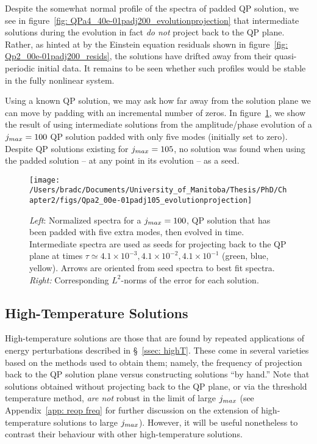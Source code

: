 \documentclass[../PhD.tex]{subfiles}
\begin{document}
Despite the somewhat normal profile of the spectra of padded QP solution, we see in figure~\ref{fig: QPa4_40e-01padj200_evolutionprojection} that intermediate solutions during the evolution in fact \emph{do not} project back to the QP plane. Rather, as hinted at by the Einstein equation residuals shown in figure~\ref{fig: Qp2_00e-01padj200_resids}, the solutions have drifted away from their quasi-periodic initial data. It remains to be seen whether such profiles would be stable in the fully nonlinear system.

Using a known QP solution, we may ask how far away from the solution plane we can move by padding with an incremental number of zeros. In figure~\ref{fig: Qpa2_00e-01padj105_evolutionprojection}, we show the result of using intermediate solutions from the amplitude/phase evolution of a $j_{max} = 100$ QP solution padded with only five modes (initially set to zero). Despite QP solutions existing for $j_{max} = 105$, no solution was found when using the padded solution -- at any point in its evolution -- as a seed.

\begin{figure}[ht]
	\centering
	\texttt{[image: /Users/bradc/Documents/University\_of\_Manitoba/Thesis/PhD/Chapter2/figs/Qpa2\_00e-01padj105\_evolutionprojection]}
	\caption{{\it Left}: Normalized spectra for a $j_{max} = 100$, QP solution that has been padded with five extra modes, then evolved in time. Intermediate spectra are used as seeds for projecting back to the QP plane at times $\tau \simeq 4.1 \times 10^{-3}, 4.1 \times 10^{-2}, 4.1 \times 10^{-1}$ (green, blue, yellow). Arrows are oriented from seed spectra to best fit spectra. {\it Right:} Corresponding $L^2$-norms of the error for each solution.}
	\label{fig: Qpa2_00e-01padj105_evolutionprojection}
\end{figure}


\subsection{High-Temperature Solutions}

High-temperature solutions are those that are found by repeated applications of energy perturbations described in \S\!~\ref{ssec: highT}. These come in several varieties based on the methods used to obtain them; namely, the frequency of projection back to the QP solution plane versus constructing solutions ``by hand.'' Note that solutions obtained without projecting back to the QP plane, or via the threshold temperature method, \emph{are not} robust in the limit of large $j_{max}$ (see Appendix~\ref{app: reop freq} for further discussion on the extension of high-temperature solutions to large $j_{max}$). However, it will be useful nonetheless to contrast their behaviour with other high-temperature solutions.
\end{document}
